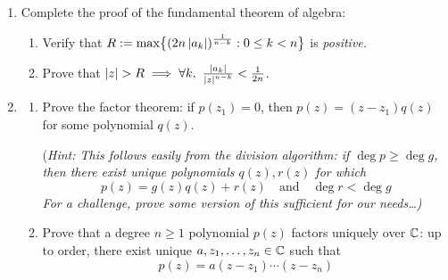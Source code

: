 \begin{exercises}
\begin{enumerate}
	
	  \item\label{exs:fundthmalg} Complete the proof of the fundamental theorem of algebra: 
	  \begin{enumerate}
	    \item Verify that $R:=\max\bigl\{(2n\left| a_k\right|)^{\frac 1{n-k}}:0\le k<n\bigr\}$ is \emph{positive.}
	    \item Prove that $\nm z>R\implies \forall k,\ \frac{\nm{a_k}}{\nm z^{n-k}}<\frac 1{2n}$.
	  \end{enumerate}
	    
	    
	  \item\begin{enumerate}
	    \item Prove the factor theorem: if $p(z_1)=0$, then $p(z)=(z-z_1)q(z)$ for some polynomial $q(z)$.\par
	    (\emph{Hint: This follows easily from the division algorithm: if $\deg p\ge \deg g$, then there exist unique polynomials $q(z),r(z)$ for which
	    \[
	    	p(z)=g(z)q(z)+r(z)\quad\text{and}\quad \deg r<\deg g
	    \]
	    For a challenge, prove some version of this sufficient for our needs\ldots)
	    }
	    \item Prove that a degree $n\ge 1$ polynomial $p(z)$ factors uniquely over $\mathbb{C}$: up to order, there exist unique $a,z_1,\ldots,z_n\in\mathbb{C}$ such that
	    \[
	    	p(z)=a(z-z_1)\cdots(z-z_n)
	    \]
	  \end{enumerate}
	\end{enumerate}
\end{exercises}

